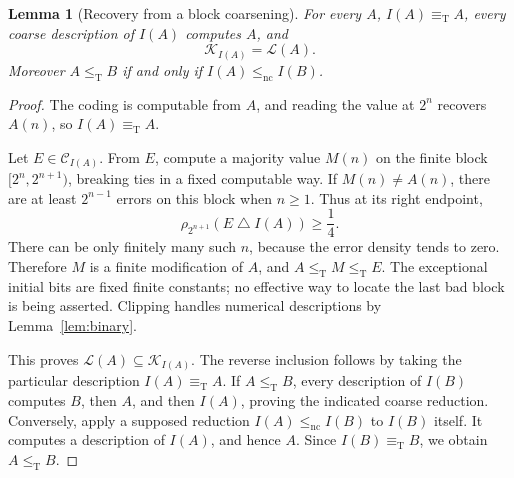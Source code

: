 \documentclass[11pt,a4paper]{article}
\newcommand{\leT}{\leq_{\mathrm T}}
\newcommand{\eqT}{\equiv_{\mathrm T}}
\newcommand{\nc}{\mathrm{nc}}
\newcommand{\CD}[1]{\mathcal C_{#1}}
\newcommand{\Core}[1]{\mathcal K_{#1}}
\newcommand{\Low}[1]{\mathcal L(#1)}
\newcommand{\sdelta}{\mathbin{\triangle}}
\newtheorem{lemma}[theorem]{Lemma}
\theoremstyle{definition}\newtheorem{definition}[theorem]{Definition}
\theoremstyle{remark}\newtheorem{remark}[theorem]{Remark}
\begin{document}
\begin{lemma}[Recovery from a block coarsening]\label{lem:coarsening}
For every $A$, $I(A)\eqT A$, every coarse description of $I(A)$ computes $A$, and
\[
                       \Core{I(A)}=\Low A.
\]
Moreover $A\leT B$ if and only if $I(A)\le_{\nc}I(B)$.
\end{lemma}
\begin{proof}
The coding is computable from $A$, and reading the value at $2^n$ recovers $A(n)$, so $I(A)\eqT A$.

Let $E\in\CD{I(A)}$. From $E$, compute a majority value $M(n)$ on the finite block $[2^n,2^{n+1})$, breaking ties in a fixed computable way. If $M(n)\ne A(n)$, there are at least $2^{n-1}$ errors on this block when $n\ge1$. Thus at its right endpoint,
\[
       \rho_{2^{n+1}}(E\sdelta I(A))\ge\frac14.
\]
There can be only finitely many such $n$, because the error density tends to zero. Therefore $M$ is a finite modification of $A$, and $A\leT M\leT E$. The exceptional initial bits are fixed finite constants; no effective way to locate the last bad block is being asserted. Clipping handles numerical descriptions by Lemma~\ref{lem:binary}.

This proves $\Low A\subseteq\Core{I(A)}$. The reverse inclusion follows by taking the particular description $I(A)\eqT A$. If $A\leT B$, every description of $I(B)$ computes $B$, then $A$, and then $I(A)$, proving the indicated coarse reduction. Conversely, apply a supposed reduction $I(A)\le_{\nc}I(B)$ to $I(B)$ itself. It computes a description of $I(A)$, and hence $A$. Since $I(B)\eqT B$, we obtain $A\leT B$.
\end{proof}
\end{document}
